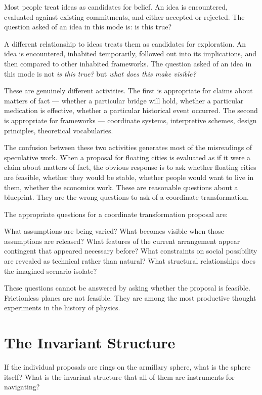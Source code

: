 \documentclass[12pt, a4paper]{article}
\theoremstyle{named}
\begin{document}
Most people treat ideas as candidates for belief. An idea is encountered,
evaluated against existing commitments, and either accepted or rejected.
The question asked of an idea in this mode is: is this true?

A different relationship to ideas treats them as candidates for
exploration. An idea is encountered, inhabited temporarily, followed
out into its implications, and then compared to other inhabited
frameworks. The question asked of an idea in this mode is not
\emph{is this true?} but \emph{what does this make visible?}

These are genuinely different activities. The first is appropriate for
claims about matters of fact — whether a particular bridge will hold,
whether a particular medication is effective, whether a particular
historical event occurred. The second is appropriate for frameworks —
coordinate systems, interpretive schemes, design principles, theoretical
vocabularies.

The confusion between these two activities generates most of the
misreadings of speculative work. When a proposal for floating cities is
evaluated as if it were a claim about matters of fact, the obvious
response is to ask whether floating cities are feasible, whether they
would be stable, whether people would want to live in them, whether the
economics work. These are reasonable questions about a blueprint. They
are the wrong questions to ask of a coordinate transformation.

The appropriate questions for a coordinate transformation proposal are:

What assumptions are being varied? What becomes visible when those
assumptions are released? What features of the current arrangement
appear contingent that appeared necessary before? What constraints
on social possibility are revealed as technical rather than natural?
What structural relationships does the imagined scenario isolate?

These questions cannot be answered by asking whether the proposal is
feasible. Frictionless planes are not feasible. They are among the most
productive thought experiments in the history of physics.

\section{The Invariant Structure}

If the individual proposals are rings on the armillary sphere, what is
the sphere itself? What is the invariant structure that all of them are
instruments for navigating?
\end{document}
